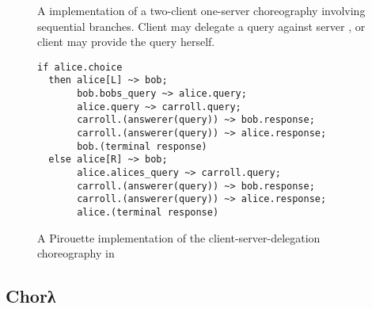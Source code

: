 \begin{figure}[tbhp]
    \begin{mdframed}
    \inputminted[xleftmargin=10pt,linenos,fontsize=\scriptsize]{bash}{figures/sequential_hls.txt}
    \caption{A \HLSCentral implementation of a two-client one-server choreography involving sequential branches.
        Client  may delegate a query against server ,
        or client  may provide the query herself.}
    \label{fig:our-client-server}
    \end{mdframed}
\end{figure}


\begin{figure}[tbhp]
    \begin{mdframed}
    \begin{verbatim}
if alice.choice
  then alice[L] ~> bob;
       bob.bobs_query ~> alice.query;
       alice.query ~> carroll.query;
       carroll.(answerer(query)) ~> bob.response;
       carroll.(answerer(query)) ~> alice.response;
       bob.(terminal response)
  else alice[R] ~> bob;
       alice.alices_query ~> carroll.query;
       carroll.(answerer(query)) ~> bob.response;
       carroll.(answerer(query)) ~> alice.response;
       alice.(terminal response)
    \end{verbatim}
    \caption{A Pirouette implementation of the client-server-delegation choreography in }
    \label{fig:pirouette-client-server}
    \end{mdframed}
\end{figure}

\subsection{Chorλ}\label{sec:chor-lambda}

